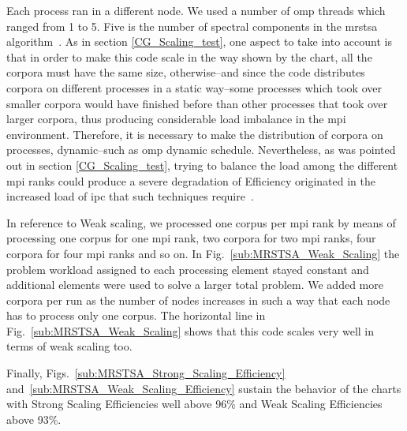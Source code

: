 {Each process ran in a different node. We used a number of \gls{omp} threads which ranged from 1 to 5. Five is the number of spectral components in the \gls{mrstsa} algorithm~\cite{10.1371/journal.pone.0217966}. As in section \ref{CG_Scaling_test}, one aspect to take into account is that in order to make this code scale in the way shown by the chart, all the corpora must have the same size, otherwise--and since the code distributes corpora on different processes in a static way--some processes which took over smaller corpora would have finished before than other processes that took over larger corpora, thus producing considerable load imbalance in the \gls{mpi} environment. Therefore, it is necessary to make the distribution of corpora on processes, dynamic--such as \gls{omp} dynamic schedule. Nevertheless, as was pointed out in section \ref{CG_Scaling_test}, trying to balance the load among the different \gls{mpi} ranks could produce a severe degradation of Efficiency originated in the increased load of \gls{ipc} that such techniques require~\cite{hu2012biophysically}.

In reference to Weak scaling, we processed one corpus per \gls{mpi} rank by means of processing one corpus for one \gls{mpi} rank, two corpora for two \gls{mpi} ranks, four corpora for four \gls{mpi} ranks and so on. In Fig.~\ref{sub:MRSTSA_Weak_Scaling} the problem workload assigned to each processing element stayed constant and additional elements were used to solve a larger total problem. We added more corpora per run as the number of nodes increases in such a way that each node has to process only one corpus. The horizontal line in Fig.~\ref{sub:MRSTSA_Weak_Scaling} shows that this code scales very well in terms of weak scaling too.

Finally, Figs.~\ref{sub:MRSTSA_Strong_Scaling_Efficiency} and~\ref{sub:MRSTSA_Weak_Scaling_Efficiency} sustain the behavior of the charts with Strong Scaling Efficiencies well above 96\% and Weak Scaling Efficiencies above 93\%.
}




